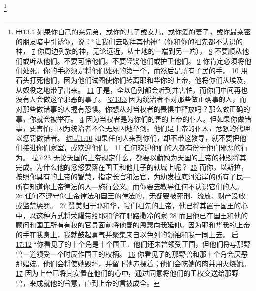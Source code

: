 \documentclass[12pt, a4paper, oneside]{ctexart}
\begin{document}
	\footnote {
		\href{https://biblehub.com/deuteronomy/13-6.htm}{申13:6} 如果你自己的亲兄弟，或你的儿子或女儿，或你爱的妻子，或你最亲密的朋友暗中引诱你，说：“让我们去敬拜其他神”（你和你的祖先都不认识的神，
		\href{https://biblehub.com/deuteronomy/13-7.htm}{7} 你周边列族的神，无论远近，从土地的一端到另一端），
		\href{https://biblehub.com/deuteronomy/13-8.htm}{8} 不要顺从他们或听从他们。不要可怜他们。不要轻饶他们或护卫他们。
		\href{https://biblehub.com/deuteronomy/13-9.htm}{9} 你肯定必须将他们处死。你的手必须是将他们处死的第一个，而然后是所有子民的手。
		\href{https://biblehub.com/deuteronomy/13-10.htm}{10} 用石头打死他们，因为他们试图使你们转离耶和华你的上帝，他将你们从埃及，从奴役之地带了出来。
		\href{https://biblehub.com/deuteronomy/13-11.htm}{11} 于是，全以色列都会听到并害怕，而你们中间再也没有人会做这个邪恶的事了。
		\href{https://biblehub.com/romans/13-3.htm}{罗13:3} 因为统治者不对那些做正确事的人，而对那些做错事的人握有恐惧。你想从对当权者的畏惧中释放吗？那么做正确的事，你就会被举荐。
		\href{https://biblehub.com/romans/13-4.htm}{4} 因为当权者是为你们的善的上帝的仆人。但如果你做错事，要害怕，因为统治者不会无原因地举剑。他们是上帝的仆人，忿怒的代理以惩罚做错者。
		\href{https://biblehub.com/2_john/1-10.htm}{约贰1:10} 如果任何人来到你们，却不带这教导，就不要把他们接进你们家室，或欢迎他们。
		\href{https://biblehub.com/2_john/1-11.htm}{11} 任何欢迎他们的人都有份于他们邪恶的行为。
		\href{https://biblehub.com/ezra/7-23.htm}{拉7:23} 无论天国的上帝规定什么，都要以勤勉为天国的上帝的神殿将其完成。为什么他的忿怒要落在国王和他儿子的辖域上呢？
		\href{https://biblehub.com/ezra/7-25.htm}{25} 而你，以斯拉，按照你具有的上帝的智慧，指定长官和法官，为幼发拉底河沿岸的所有子民---所有知道你上帝律法的人---施行公义。而你要去教导任何不认识它们的人。
		\href{https://biblehub.com/ezra/7-26.htm}{26} 任何不遵守你上帝律法和国王的律法的，无疑要被死刑、流放、财产没收或监禁惩罚。
		\href{https://biblehub.com/ezra/7-27.htm}{27} 赞美归于耶和华，我们祖先的上帝，他已将其置于国王的心中，以这种方式将荣耀带给耶和华在耶路撒冷的家
		\href{https://biblehub.com/ezra/7-28.htm}{28} 而且他已在国王和他的顾问和国王所有有权的官员面前将他善的恩惠向我延伸。因为耶和华我的上帝的手在我身上，我就鼓起勇气并聚集来自以色列的领袖和我一同上去。
		\href{https://biblehub.com/revelation/17-12.htm}{启17:12} “你看见了的十个角是十个国王，他们还未曾领受王国，但他们将与那野兽一道领受一个时辰作国王的权柄。
		\href{https://biblehub.com/revelation/17-16.htm}{16} 你看见了的那野兽和那十个角会厌恶那娼妓。他们会将使她毁坏，并留下她赤裸着；他们会吃她的肉并用火烧她。
		\href{https://biblehub.com/revelation/17-17.htm}{17} 因为上帝已将其安置在他们的心中，通过同意将他们的王权交送给那野兽，来成就他的旨意，直到上帝的言被成全。
}
\end{document}
